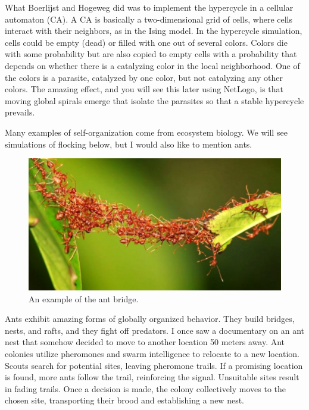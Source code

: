 \documentclass[
  a4paper,
  DIV=11,
  numbers=noendperiod,
  oneside]{scrreprt}
\begin{document}
What Boerlijst and Hogeweg did was to implement the hypercycle in a
cellular automaton (CA). A CA is basically a two-dimensional grid of
cells, where cells interact with their neighbors, as in the Ising model.
In the hypercycle simulation, cells could be empty (dead) or filled with
one out of several colors. Colors die with some probability but are also
copied to empty cells with a probability that depends on whether there
is a catalyzing color in the local neighborhood. One of the colors is a
parasite, catalyzed by one color, but not catalyzing any other colors.
The amazing effect, and you will see this later using NetLogo, is that
moving global spirals emerge that isolate the parasites so that a stable
hypercycle prevails.

Many examples of self-organization come from ecosystem biology. We will
see simulations of flocking below, but I would also like to mention
ants.

\begin{figure}

{\centering \includegraphics{media/ch5n/image2b.jpeg}

}

\caption{\label{fig-ch5n-img2-old-40}An example of the ant bridge.}

\end{figure}

Ants exhibit amazing forms of globally organized behavior. They build
bridges, nests, and rafts, and they fight off predators. I once saw a
documentary on an ant nest that somehow decided to move to another
location 50 meters away. Ant colonies utilize pheromones and swarm
intelligence to relocate to a new location. Scouts search for potential
sites, leaving pheromone trails. If a promising location is found, more
ants follow the trail, reinforcing the signal. Unsuitable sites result
in fading trails. Once a decision is made, the colony collectively moves
to the chosen site, transporting their brood and establishing a new
nest.
\end{document}
